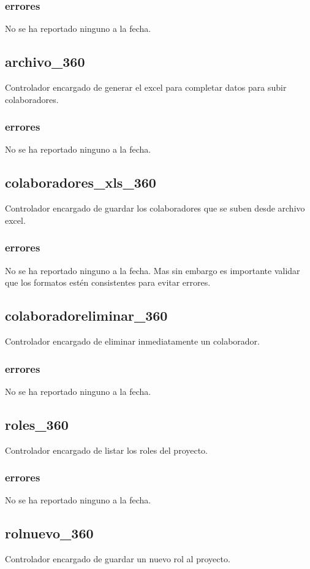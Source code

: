 \documentclass[10pt,a4paper]{book}
\begin{document}
	\subsubsection{errores}
	No se ha reportado ninguno a la fecha.

	\subsection{archivo\_360}
	Controlador encargado de generar el excel para completar datos para subir colaboradores.
	\subsubsection{errores}
	No se ha reportado ninguno a la fecha.

	\subsection{colaboradores\_xls\_360}
	Controlador encargado de guardar los colaboradores que se suben desde archivo excel.
	\subsubsection{errores}
	No se ha reportado ninguno a la fecha. Mas sin embargo es importante validar que los formatos estén consistentes para evitar errores.

	\subsection{colaboradoreliminar\_360}
	Controlador encargado de eliminar inmediatamente un colaborador.
	\subsubsection{errores}
	No se ha reportado ninguno a la fecha.

	\subsection{roles\_360}
	Controlador encargado de listar los roles del proyecto.
	\subsubsection{errores}
	No se ha reportado ninguno a la fecha.

	\subsection{rolnuevo\_360}
	Controlador encargado de guardar un nuevo rol al proyecto.
\end{document}
